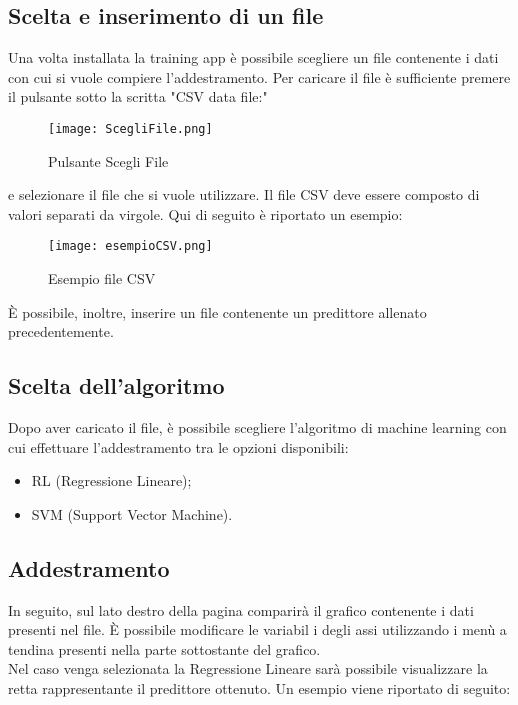 \documentclass[../manuale-utente.tex]{subfiles}
\begin{document}
\subsection{Scelta e inserimento di un file}
\label{subs:scelta-e-inserimento}
Una volta installata la training app è possibile scegliere un file contenente i dati con cui si vuole compiere l'addestramento. Per caricare il file è sufficiente premere il pulsante sotto la scritta "CSV data file:"

\begin{figure}[h!]
  \begin{center}
    \texttt{[image: ScegliFile.png]}\\
    \caption{Pulsante Scegli File}%
    \label{fig:scegli-file}
  \end{center}
\end{figure}
e selezionare il file che si vuole utilizzare. Il file CSV deve essere composto di valori separati da virgole. Qui di seguito è riportato un esempio:

\begin{figure}[h!]
  \begin{center}
    \texttt{[image: esempioCSV.png]}\\
    \caption{Esempio file CSV}%
    \label{fig:esempioCSV}
  \end{center}
  \end{figure}

  È possibile, inoltre, inserire un file contenente un predittore allenato precedentemente.

\subsection{Scelta dell'algoritmo}
\label{subs:scelta-algoritmo}
Dopo aver caricato il file, è possibile scegliere l'algoritmo di machine learning con cui effettuare l'addestramento tra le opzioni disponibili:
\begin{itemize}
  \item RL (Regressione Lineare);
  \item SVM (Support Vector Machine).
\end{itemize}

\newpage
\subsection{Addestramento}
\label{subs:addestramento}

In seguito, sul lato destro della pagina comparirà il grafico contenente i dati presenti nel file. È possibile modificare le variabil i degli assi utilizzando i menù a tendina presenti nella parte sottostante del grafico.\\
Nel caso venga selezionata la Regressione Lineare sarà possibile visualizzare la retta rappresentante il predittore ottenuto. Un esempio viene riportato di seguito:
\end{document}
